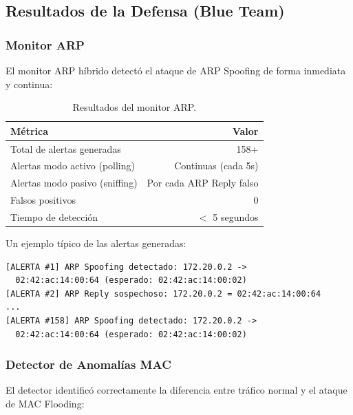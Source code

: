 \documentclass[12pt, a4paper]{article}
\begin{document}
\subsection{Resultados de la Defensa (Blue Team)}

\subsubsection{Monitor ARP}

El monitor ARP h\'ibrido detect\'o el ataque de ARP Spoofing de forma inmediata y continua:

\begin{table}[H]
    \centering
    \caption{Resultados del monitor ARP.}
    \label{tab:arp-monitor-results}
    \begin{tabular}{|l|r|}
        \hline
        \textbf{M\'etrica} & \textbf{Valor} \\
        \hline\hline
        Total de alertas generadas & 158+ \\
        \hline
        Alertas modo activo (polling) & Continuas (cada 5s) \\
        \hline
        Alertas modo pasivo (sniffing) & Por cada ARP Reply falso \\
        \hline
        Falsos positivos & 0 \\
        \hline
        Tiempo de detecci\'on & $<$ 5 segundos \\
        \hline
    \end{tabular}
\end{table}

Un ejemplo t\'ipico de las alertas generadas:

\begin{lstlisting}[style=bashstyle, caption={Salida del monitor ARP durante el ataque}]
[ALERTA #1] ARP Spoofing detectado: 172.20.0.2 ->
  02:42:ac:14:00:64 (esperado: 02:42:ac:14:00:02)
[ALERTA #2] ARP Reply sospechoso: 172.20.0.2 = 02:42:ac:14:00:64
...
[ALERTA #158] ARP Spoofing detectado: 172.20.0.2 ->
  02:42:ac:14:00:64 (esperado: 02:42:ac:14:00:02)
\end{lstlisting}

\subsubsection{Detector de Anomal\'ias MAC}

El detector identific\'o correctamente la diferencia entre tr\'afico normal y el ataque de MAC Flooding:
\end{document}
